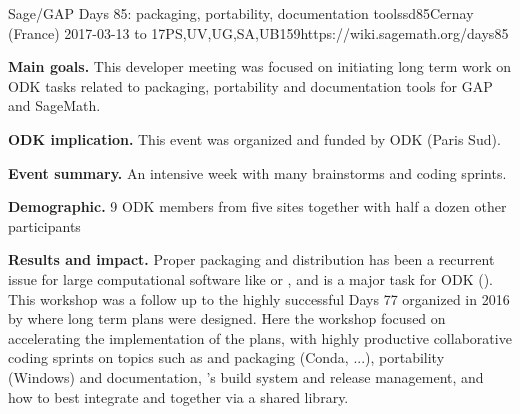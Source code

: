 \begin{event}{Sage/GAP Days 85: packaging, portability, documentation tools}{sd85}{Cernay (France) 2017-03-13 to 17}{PS,UV,UG,SA,UB}{15}{9}{https://wiki.sagemath.org/days85}

  \textbf{Main goals.} This developer meeting was focused on
  initiating long term work on ODK tasks related to packaging,
  portability and documentation tools for GAP and SageMath.

  \textbf{ODK implication.} This event was organized and funded by
  ODK (Paris Sud).

  \textbf{Event summary.} An intensive week with many brainstorms and coding sprints.

  \textbf{Demographic.} 9 ODK members from five sites together with
  half a dozen other participants

  \textbf{Results and impact.} Proper packaging and distribution has
  been a recurrent issue for large computational software like \Sage
  or \GAP, and is a major task for ODK
  (). This workshop
  was a follow up to the highly successful \Sage Days 77 organized in
  2016 by \ODK where long term plans were designed. Here the workshop
  focused on accelerating the implementation of the plans, with highly
  productive collaborative coding sprints on topics such as \GAP and
  \Sage packaging (Conda, ...), \Sage portability (Windows) and
  documentation, \GAP's build system and release management, and how
  to best integrate \GAP and \Sage together via a shared library.
\end{event}
